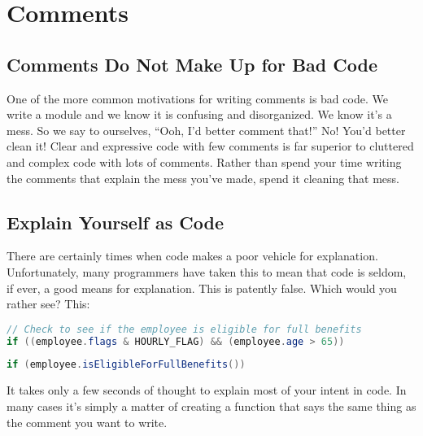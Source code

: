 
\chapter{Comments}

\section{Comments Do Not Make Up for Bad Code}

One of the more common motivations for writing comments is bad code. We write a module
and we know it is confusing and disorganized. We know it’s a mess. So we say to ourselves,
“Ooh, I’d better comment that!” No! You’d better clean it!
Clear and expressive code with few comments is far superior to cluttered and complex
code with lots of comments. Rather than spend your time writing the comments that
explain the mess you've made, spend it cleaning that mess.

\section{Explain Yourself as Code}

There are certainly times when code makes a poor vehicle for explanation. Unfortunately, many programmers have taken this to mean that code is seldom, if ever, a good means for explanation. This is patently false. Which would you rather see? This:

\begin{tcolorbox}[breakable, colback=blue!10!white, colframe=blue!85!black]

\begin{lstlisting}[language = java, basicstyle=\small]
// Check to see if the employee is eligible for full benefits
if ((employee.flags & HOURLY_FLAG) && (employee.age > 65))
\end{lstlisting}

\tcblower

\begin{lstlisting}[language = java, basicstyle=\small]
if (employee.isEligibleForFullBenefits())
\end{lstlisting}

\end{tcolorbox}

It takes only a few seconds of thought to explain most of your intent in code. In many cases it’s simply a matter of creating a function that says the same thing as the comment you want to write.

